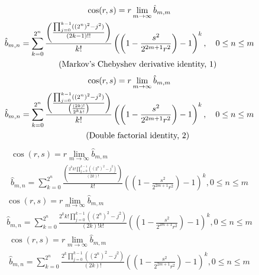 \documentclass[a4paper,12pt]{report}
\newcommand{\equationnote}[1]{%
    \refstepcounter{equation}%
    \tag{#1, \theequation}%
}
\begin{document}
\begin{subequations}
\begin{gather}
\cos(r,s) = r \lim_{m \to \infty} \hat{b}_{m,m} \\
\hat{b}_{m,n} = \sum_{k=0}^{2^n} \frac{\left(\frac{\prod_{j=0}^{k-1} ((2^n)^2 - j^2)}{(2k - 1)!!}\right)}{k!} \left(\left(1 - \frac{s^2}{2^{2m+1}r^2}\right) - 1\right)^k, \quad 0 \leq n \leq m \notag \\
\equationnote{Markov's Chebyshev derivative identity}
\end{gather}
\end{subequations}
\begin{subequations}
\begin{gather}
\cos(r,s) = r \lim_{m \to \infty} \hat{b}_{m,m} \\
\hat{b}_{m,n} = \sum_{k=0}^{2^n} \frac{\left(\frac{\prod_{j=0}^{k-1} ((2^n)^2 - j^2)}{\left(\frac{(2k)!}{2^k k!}\right)}\right)}{k!} \left(\left(1 - \frac{s^2}{2^{2m+1}r^2}\right) - 1\right)^k, \quad 0 \leq n \leq m \notag \\
\equationnote{Double factorial identity}
\end{gather}
\end{subequations}
\begin{subequations}
\begin{gather}
\cos(r,s) = r \lim \limits_{m \to \infty} \hat{b}_{m,m} \\
\hat{b}_{m,n} = \sum \limits_{k=0}^{2^n} \frac{\left(\frac{2^k k! \prod \limits_{j=0}^{k-1} ((2^n)^2 - j^2)}{(2k)!}\right)}{k!} \left(\left(1 - \frac{s^2}{2^{2m+1}r^2}\right) - 1\right)^k, 0 \leq n \leq m
\end{gather}
\end{subequations}
\begin{subequations}
\begin{gather}
\cos(r,s) = r \lim \limits_{m \to \infty} \hat{b}_{m,m} \\
\hat{b}_{m,n} = \sum \limits_{k=0}^{2^n} \frac{2^k k! \prod \limits_{j=0}^{k-1} ((2^n)^2 - j^2)}{(2k)! k!} \left(\left(1 - \frac{s^2}{2^{2m+1}r^2}\right) - 1\right)^k, 0 \leq n \leq m
\end{gather}
\end{subequations}
\begin{subequations}
\begin{gather}
\cos(r,s) = r \lim \limits_{m \to \infty} \hat{b}_{m,m} \\
\hat{b}_{m,n} = \sum \limits_{k=0}^{2^n} \frac{2^k \prod \limits_{j=0}^{k-1} ((2^n)^2 - j^2)}{(2k)!} \left(\left(1 - \frac{s^2}{2^{2m+1}r^2}\right) - 1\right)^k, 0 \leq n \leq m
\end{gather}
\end{subequations}
\end{document}
